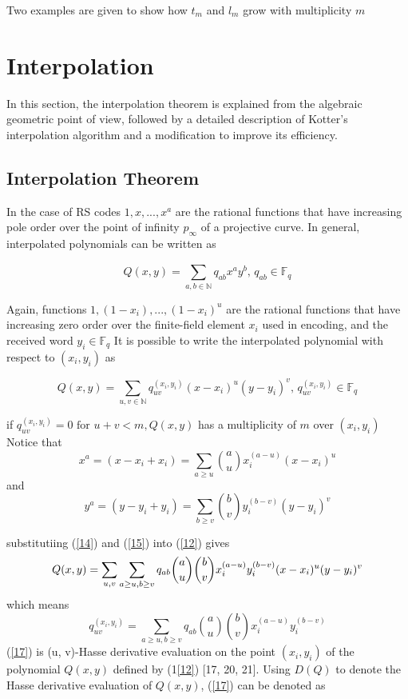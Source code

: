 \documentclass[fontsize=12pt]{article}
\begin{document}
Two examples are given to show how $t_m$ and $l_m$ grow with multiplicity $m$


\section{Interpolation}
In this section, the interpolation theorem is explained from the algebraic geometric point of view, followed by a detailed description of Kotter's interpolation algorithm and a modification to improve its efficiency.

\subsection{Interpolation Theorem}
In the case of RS codes $1,x,...,x^a$ are the rational functions that have increasing pole order over the point of infinity $p_{\infty}$ of a projective curve. In general, interpolated polynomials can be written as 

\begin{equation}
Q(x,y) = \sum_{a,b \in \mathbb{N}}^{} q_{ab}x^ay^b \text{, } q_{ab} \in \mathbb{F}_q
\label{12}
\end{equation}

Again, functions $1, (1-x_i),...,(1-x_i)^u$ are the rational functions that have
increasing zero order over the finite-field element $x_i$ used in
encoding, and the received word $y_i \in \mathbb{F}_q$ It is possible to write the interpolated polynomial with respect to $(x_i,y_i) $ as 

\begin{equation}
Q(x,y) = \sum_{u,v \in \mathbb{N}}^{} q_{uv}^{(x_i,y_i)}(x-x_i)^u (y-y_i)^v \text{, } q_{uv}^{(x_i,y_i)} \in \mathbb{F}_q
\label{13}
\end{equation}

if $q_{uv}^{(x_i,y_i)}= 0 \text{ for } u + v < m, Q(x,y) $ has a multiplicity of $m$ over $(x_i,y_i)$
Notice that 
\begin{equation}
x^a = (x -x_i+x_i) = \sum_{a \geq u} \binom{a}{u} x_i^{(a-u)}(x - x_i)^u
\label{14}
\end{equation}
and 
\begin{equation}
y^a = (y -y_i+y_i) = \sum_{b \geq v} \binom{b}{v} y_i^{(b-v)}(y - y_i)^v
\label{15}
\end{equation}

substitutiing (\ref{14}) and (\ref{15}) into (\ref{12})  gives
\begin{equation}
Q(x,y) = \sum_{u,v} \sum_{a \geq u,b \geq v} q_{ab}\binom{a}{u} \binom{b}{v} x_i^{(a-u)}y_i^{(b-v)}\\
(x - x_i)^u  (y - y_i)^v
\end{equation}
which means 
\begin{equation}
q_{uv}^{(x_i,y_i)} =\sum_{a \geq u,b \geq v} q_{ab}\binom{a}{u} \binom{b}{v} x_i^{(a-u)}y_i^{(b-v)}
\label{17}
\end{equation}
(\ref{17}) is  (u, v)-Hasse derivative evaluation on the point
$(x_i, y_i)$ of the polynomial $Q(x, y)$ defined by (1\ref{12}) [17, 20,
21]. Using $D(Q)$ to denote the Hasse derivative evaluation
of $Q(x, y)$, (\ref{17}) can be denoted as
\end{document}
